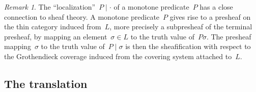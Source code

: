 \documentclass[com,11pt,crcready]{iosart2x}
\theoremstyle{definition}
\theoremstyle{plain}
\theoremstyle{remark}
\newtheorem{remark}[definition]{Remark}
\newcommand{\?}{\,{:}\,}
\renewcommand{\_}{\mathpunct{.}\,}
\begin{document}
\begin{remark}The ``localization''~$P \mid \cdot$ of a monotone predicate~$P$
has a close connection to sheaf theory. A monotone
predicate~$P$ gives rise to a presheaf on the thin category induced from~$L$,
more precisely a subpresheaf of the terminal presheaf, by mapping an
element~$\sigma \in L$ to the truth value of~$P\sigma$. The presheaf
mapping~$\sigma$ to the truth value of~$P \mid \sigma$ is then the
sheafification with respect to the Grothendieck coverage induced from the
covering system attached to~$L$.\end{remark}








\subsection{The translation}\label{sect:translation}
\end{document}
